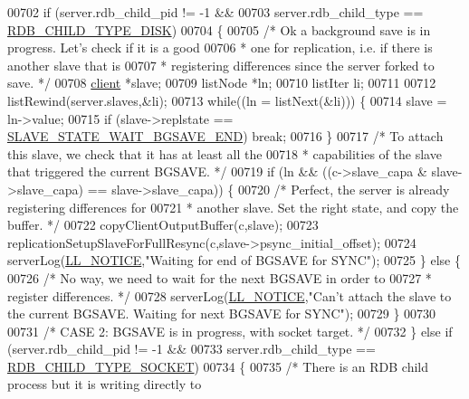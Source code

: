 \begin{DoxyCode}
{{{{{{{{{{{{{{{{{{{{{{{{{{{{{{00702     \textcolor{keywordflow}{if} (server.rdb\_child\_pid != -1 &&
00703         server.rdb\_child\_type == \hyperlink{server_8h_a9d886e992717fa246dd7954244ff6bdf}{RDB\_CHILD\_TYPE\_DISK})
00704     \{
00705         \textcolor{comment}{/* Ok a background save is in progress. Let's check if it is a good}
00706 \textcolor{comment}{         * one for replication, i.e. if there is another slave that is}
00707 \textcolor{comment}{         * registering differences since the server forked to save. */}
00708         \hyperlink{structclient}{client} *slave;
00709         listNode *ln;
00710         listIter li;
00711 
00712         listRewind(server.slaves,&li);
00713         \textcolor{keywordflow}{while}((ln = listNext(&li))) \{
00714             slave = ln->value;
00715             \textcolor{keywordflow}{if} (slave->replstate == \hyperlink{server_8h_a2a1b586e8f326f831f6ab466c8c3f38a}{SLAVE\_STATE\_WAIT\_BGSAVE\_END}) \textcolor{keywordflow}{break};
00716         \}
00717         \textcolor{comment}{/* To attach this slave, we check that it has at least all the}
00718 \textcolor{comment}{         * capabilities of the slave that triggered the current BGSAVE. */}
00719         \textcolor{keywordflow}{if} (ln && ((c->slave\_capa & slave->slave\_capa) == slave->slave\_capa)) \{
00720             \textcolor{comment}{/* Perfect, the server is already registering differences for}
00721 \textcolor{comment}{             * another slave. Set the right state, and copy the buffer. */}
00722             copyClientOutputBuffer(c,slave);
00723             replicationSetupSlaveForFullResync(c,slave->psync\_initial\_offset);
00724             serverLog(\hyperlink{server_8h_a8c54c191e436c7dd3012167212692401}{LL\_NOTICE},\textcolor{stringliteral}{"Waiting for end of BGSAVE for SYNC"});
00725         \} \textcolor{keywordflow}{else} \{
00726             \textcolor{comment}{/* No way, we need to wait for the next BGSAVE in order to}
00727 \textcolor{comment}{             * register differences. */}
00728             serverLog(\hyperlink{server_8h_a8c54c191e436c7dd3012167212692401}{LL\_NOTICE},\textcolor{stringliteral}{"Can't attach the slave to the current BGSAVE. Waiting for
       next BGSAVE for SYNC"});
00729         \}
00730 
00731     \textcolor{comment}{/* CASE 2: BGSAVE is in progress, with socket target. */}
00732     \} \textcolor{keywordflow}{else} \textcolor{keywordflow}{if} (server.rdb\_child\_pid != -1 &&
00733                server.rdb\_child\_type == \hyperlink{server_8h_acdbf61346e1d2f54716e2ab6fe73e954}{RDB\_CHILD\_TYPE\_SOCKET})
00734     \{
00735         \textcolor{comment}{/* There is an RDB child process but it is writing directly to}
}}}}}}}}}}}}}}}}}}}}}}}}}}}}}}
\end{DoxyCode}

